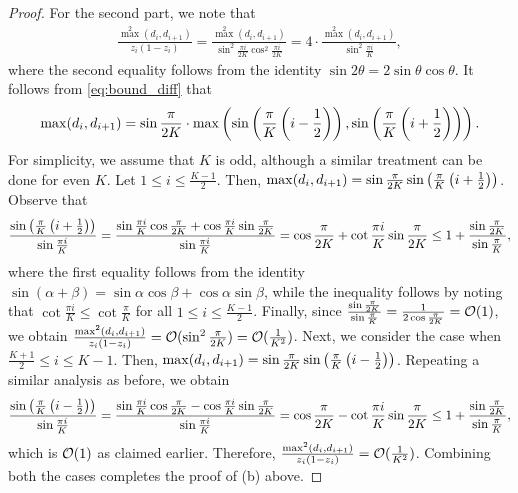 \begin{proof}
    For the second part, we note that \begin{align*}
        \frac{\max ^ {2}(d_{i}, d_{i + 1})}{z_{i}(1 - z_{i})} = \frac{\max ^ {2}(d_{i}, d_{i + 1})}{\sin ^ {2} \frac{\pi i}{2K} \cos ^ {2} \frac{\pi i}{2K}} = 4 \cdot \frac{\max ^ {2}(d_{i}, d_{i + 1})}{\sin ^ {2} \frac{\pi i}{K}}, 
    \end{align*}
    where the second equality follows from the identity $\sin 2\theta = 2\sin \theta \cos \theta$. It follows from \eqref{eq:bound_diff} that \begin{align*}
        \max(d_{i}, d_{i + 1}) = \sin \frac{\pi}{2K} \cdot \max\left( \sin \left( \frac{\pi}{K} \left( i - \frac{1}{2} \right) \right), \sin \left( \frac{\pi}{K} \left( i + \frac{1}{2} \right) \right) \right).
    \end{align*}
    For simplicity, we assume that $K$ is odd, although a similar treatment can be done for even $K$. Let $1 \le i \le \frac{K - 1}{2}$. Then,  $\max(d_{i}, d_{i + 1}) = \sin \frac{\pi}{2K} \sin \left( \frac{\pi}{K} \left( i + \frac{1}{2} \right) \right)$. Observe that \begin{align*}
        \frac{\sin \left( \frac{\pi}{K} \left( i + \frac{1}{2} \right) \right)}{\sin \frac{\pi i}{K}} = \frac{\sin \frac{\pi i}{K} \cos \frac{\pi}{2K} + \cos \frac{\pi i}{K} \sin \frac{\pi}{2K}}{\sin \frac{\pi i}{K}} = \cos \frac{\pi}{2K} + \cot \frac{\pi i}{K} \sin \frac{\pi}{2K} \le 1 + \frac{\sin \frac{\pi}{2K}}{\sin \frac{\pi}{K}}, 
    \end{align*}
    where the first equality follows from the identity $\sin (\alpha + \beta) = \sin \alpha \cos \beta + \cos \alpha \sin \beta$, while the inequality follows by noting that $\cot \frac{\pi i}{K} \le \cot \frac{\pi}{K}$ for all $1 \le i \le \frac{K - 1}{2}$. Finally, since $\frac{\sin \frac{\pi}{2K}}{\sin \frac{\pi}{K}} = \frac{1}{2 \cos \frac{\pi}{2K}} = \mathcal{O}(1)$, we obtain $\frac{\max ^ {2} (d_{i}, d_{i + 1})}{z_{i}(1 - z_{i})} = \mathcal{O} (\sin ^ {2} \frac{\pi}{2K}) = \mathcal{O}(\frac{1}{K ^ {2}})$. Next, we consider the case when $\frac{K + 1}{2} \le i  \le K - 1$. Then, $\max(d_{i}, d_{i + 1}) = \sin \frac{\pi}{2K} \sin \left( \frac{\pi}{K} \left( i - \frac{1}{2} \right) \right)$. Repeating a similar analysis as before, we obtain \begin{align*}
         \frac{\sin \left( \frac{\pi}{K} \left( i - \frac{1}{2} \right) \right)}{\sin \frac{\pi i}{K}} = \frac{\sin \frac{\pi i}{K} \cos \frac{\pi}{2K} - \cos \frac{\pi i}{K} \sin \frac{\pi}{2K}}{\sin \frac{\pi i}{K}} = \cos \frac{\pi}{2K} - \cot \frac{\pi i}{K} \sin \frac{\pi}{2K} \le 1 + \frac{\sin \frac{\pi}{2K}}{\sin \frac{\pi}{K}},
    \end{align*}
    which is $\mathcal{O}(1)$ as claimed earlier. Therefore, $\frac{\max ^ {2}(d_{i}, d_{i + 1})}{z_{i}(1 - z_{i})} = \mathcal{O}(\frac{1}{K ^ {2}})$. Combining both the cases completes the proof of (b) above. 
    

\end{proof}
